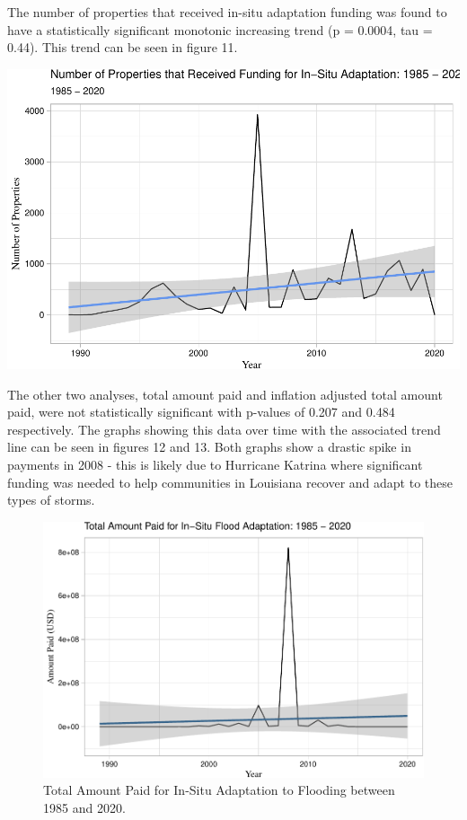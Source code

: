 \documentclass[
  12pt,
]{article}
\begin{document}
The number of properties that received in-situ adaptation funding was
found to have a statistically significant monotonic increasing trend (p
= 0.0004, tau = 0.44). This trend can be seen in figure 11.

\includegraphics{finalreport_files/figure-latex/unnamed-chunk-20-1.pdf}
\newpage

The other two analyses, total amount paid and inflation adjusted total
amount paid, were not statistically significant with p-values of 0.207
and 0.484 respectively. The graphs showing this data over time with the
associated trend line can be seen in figures 12 and 13. Both graphs show
a drastic spike in payments in 2008 - this is likely due to Hurricane
Katrina where significant funding was needed to help communities in
Louisiana recover and adapt to these types of storms.

\begin{figure}
\centering
\includegraphics{finalreport_files/figure-latex/unnamed-chunk-21-1.pdf}
\caption{Total Amount Paid for In-Situ Adaptation to Flooding between
1985 and 2020.}
\end{figure}
\end{document}
